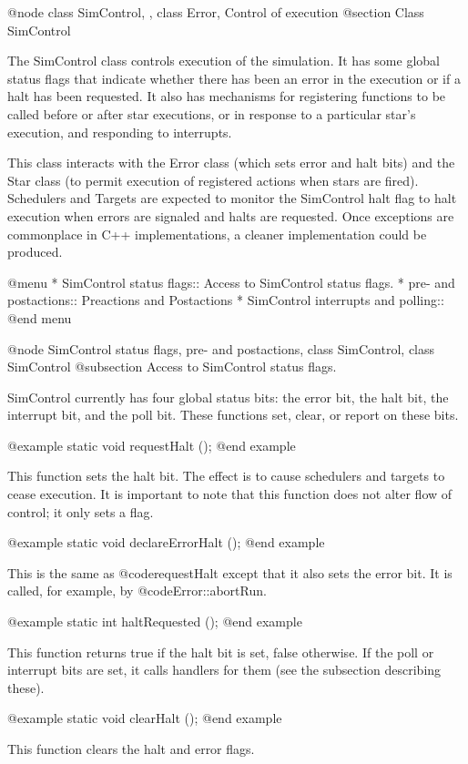 @node class SimControl,  , class Error, Control of execution
@section Class SimControl

The SimControl class controls execution of the simulation.  It has
some global status flags that indicate whether there has been an
error in the execution or if a halt has been requested.  It also
has mechanisms for registering functions to be called before or
after star executions, or in response to a particular star's execution,
and responding to interrupts.

This class interacts with the Error class (which sets error and halt
bits) and the Star class (to permit execution of registered actions when
stars are fired).  Schedulers and Targets are expected to monitor
the SimControl halt flag to halt execution when errors are signaled
and halts are requested.  Once exceptions are commonplace in C++
implementations, a cleaner implementation could be produced.

@menu
* SimControl status flags::     Access to SimControl status flags.
* pre- and postactions::        Preactions and Postactions
* SimControl interrupts and polling::
@end menu

@node SimControl status flags, pre- and postactions, class SimControl, class SimControl
@subsection Access to SimControl status flags.

SimControl currently has four global status bits: the error bit,
the halt bit, the interrupt bit, and the poll bit.  These functions
set, clear, or report on these bits.

@example
static void requestHalt ();
@end example

This function sets the halt bit.  The effect is to cause schedulers
and targets to cease execution.  It is important to note that this
function does not alter flow of control; it only sets a flag.

@example
static void declareErrorHalt ();
@end example

This is the same as @code{requestHalt} except that it also sets the
error bit.  It is called, for example, by @code{Error::abortRun}.

@example
static int haltRequested ();
@end example

This function returns true if the halt bit is set, false otherwise.
If the poll or interrupt bits are set, it calls handlers for them
(see the subsection describing these).

@example
static void clearHalt ();
@end example

This function clears the halt and error flags.

